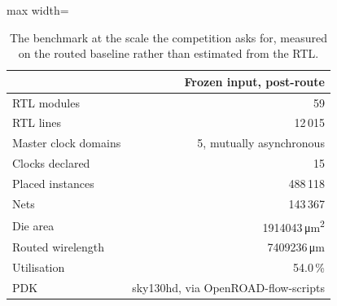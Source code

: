 \begin{table}[htbp]
  \centering
  \footnotesize
  \caption{The benchmark at the scale the competition asks for, measured on the routed baseline rather than estimated from the RTL.}
  \label{tab:scale}
  \begin{adjustbox}{max width=\textwidth}
  \begin{tabular}{lr}
    \toprule
    \textbf{} & \textbf{Frozen input, post-route} \\
    \midrule
    RTL modules & 59 \\
    RTL lines & 12\,015 \\
    Master clock domains & 5, mutually asynchronous \\
    Clocks declared & 15 \\
    Placed instances & 488\,118 \\
    Nets & 143\,367 \\
    Die area & 1914043\,\si{\um\squared} \\
    Routed wirelength & 7409236\,\si{\um} \\
    Utilisation & 54.0\,\% \\
    PDK & sky130hd, via OpenROAD-flow-scripts \\
    \bottomrule
  \end{tabular}
  \end{adjustbox}
\end{table}
